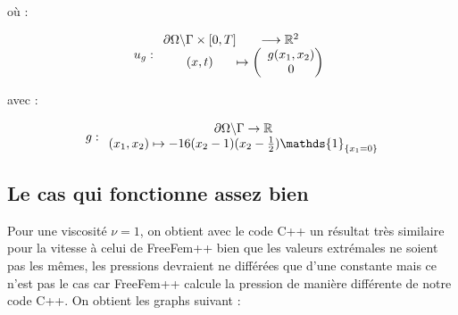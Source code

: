\documentclass[a4paper,12pt]{article}
\begin{document}
où :

\begin{equation}
u_g : \begin{array}{c @{} c}
\partial \Omega \backslash \Gamma \times [0,T] & \longrightarrow \mathbb{R}^2 \\
(x,t) & \mapsto \left( \begin{array}{c @{} c}
g(x_1,x_2) \\
0
\end{array}
\right)
\end{array}
\end{equation}

avec :

\begin{equation}
g : \begin{array}{c @{} c}
\partial \Omega \backslash \Gamma \to \mathbb{R} \\
(x_1,x_2) \mapsto -16(x_2-1)(x_2-\frac{1}{2}) \mathds{1}_{\{x_1 = 0\}}
\end{array}
\end{equation}

\subsection{Le cas qui fonctionne assez bien}

Pour une viscosité $\nu = 1$, on obtient avec le code C++ un résultat très similaire pour la vitesse à celui de FreeFem++ bien que les valeurs extrémales ne soient pas les mêmes, les pressions devraient ne différées que d'une constante mais ce n'est pas le cas car FreeFem++ calcule la pression de manière différente de notre code C++.
On obtient les graphs suivant :

\newpage
\end{document}
